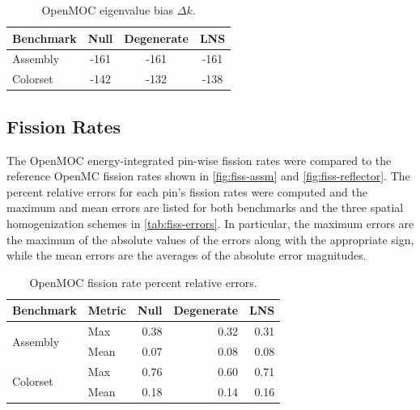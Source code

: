 
\begin{table}[h!]
  \centering
  \caption{OpenMOC eigenvalue bias $\Delta k$.}
  \label{tab:keff-bias}
  \begin{tabular}{l c c c}
  \toprule
  \textbf{Benchmark} & \textbf{Null} & \textbf{Degenerate} & \textbf{LNS} \\
  \midrule
  Assembly & -161 & -161 & -161 \\
  Colorset & -142 & -132 & -138 \\
  \bottomrule
\end{tabular}
\end{table}


\subsection{Fission Rates}
\label{subsec:fiss-rates}

The OpenMOC energy-integrated pin-wise fission rates were compared to the reference OpenMC fission rates shown in \autoref{fig:fiss-assm} and \autoref{fig:fiss-reflector}. The percent relative errors for each pin's fission rates were computed and the maximum and mean errors are listed for both benchmarks and the three spatial homogenization schemes in \autoref{tab:fiss-errors}. In particular, the maximum errors are the maximum of the absolute values of the errors along with the appropriate sign, while the mean errors are the averages of the absolute error magnitudes.

\begin{table}[h!]
  \centering
  \caption{OpenMOC fission rate percent relative errors.}
  \label{tab:fiss-errors}
  \begin{tabular}{l l r r r}
  \toprule
  \textbf{Benchmark} & \textbf{Metric} & \textbf{Null} & \textbf{Degenerate} & \textbf{LNS} \\
  \midrule
  \multirow{2}{*}{Assembly} & Max  & 0.38 & 0.32 & 0.31 \\
                            & Mean & 0.07 & 0.08 & 0.08 \\
  \midrule
  \multirow{2}{*}{Colorset} & Max  & 0.76 & 0.60 & 0.71 \\
                            & Mean & 0.18 & 0.14 & 0.16 \\
  \bottomrule
\end{tabular}
\end{table}

